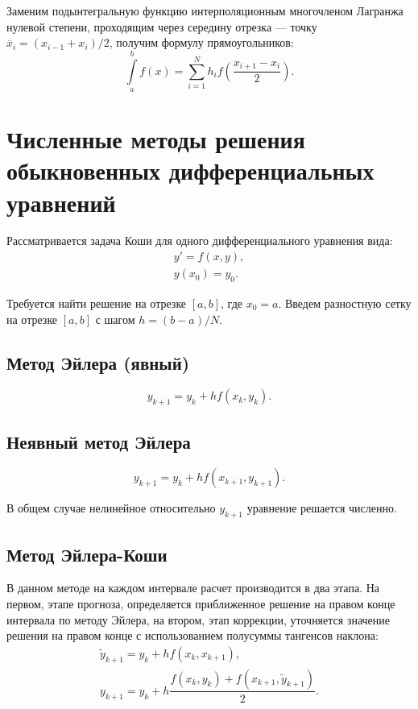 \documentclass[12pt]{report}
\theoremstyle{definition}
\begin{document}
Заменим подынтегральную функцию интерполяционным многочленом Лагранжа нулевой
степени, проходящим через середину отрезка --- точку
$\overline{x}_i = (x_{i-1} + x_i) / 2$, получим формулу прямоугольников:
$$
\int\limits_a^b f(x) = \sum\limits_{i=1}^N h_i f( \dfrac{x_{i+1} - x_i}{2} ).
$$


\section{Численные методы решения обыкновенных дифференциальных уравнений}

Рассматривается задача Коши для одного дифференциального уравнения вида:
\begin{gather*}
y' = f(x, y), \\
y(x_0) = y_0.
\end{gather*}

Требуется найти решение на отрезке $[a, b]$, где $x_0 = a$. Введем
разностную сетку на отрезке $[a, b]$ с шагом $h = (b-a) / N$. 

\subsection{Метод Эйлера (явный)}
$$
y_{k+1} = y_k + h f(x_k, y_k).
$$

\subsection{Неявный метод Эйлера}
$$
y_{k+1} = y_k + h f(x_{k + 1}, y_{k + 1}).
$$

В общем случае нелинейное относительно $y_{k+1}$ уравнение решается
численно.

\subsection{Метод Эйлера-Коши}

В данном методе на каждом интервале расчет производится в два этапа.
На первом, этапе прогноза, определяется приближенное решение на правом конце
интервала по методу Эйлера, на втором, этап коррекции, уточняется значение
решения на правом конце с использованием полусуммы тангенсов наклона:
\begin{gather*}
\widetilde{y}_{k+1} = y_k + h f(x_k, x_{k+1}), \\
y_{k+1} = y_{k} + h\dfrac{f(x_k, y_k) + f(x_{k+1}, \widetilde{y}_{k+1})}{2}.
\end{gather*}
\end{document}
